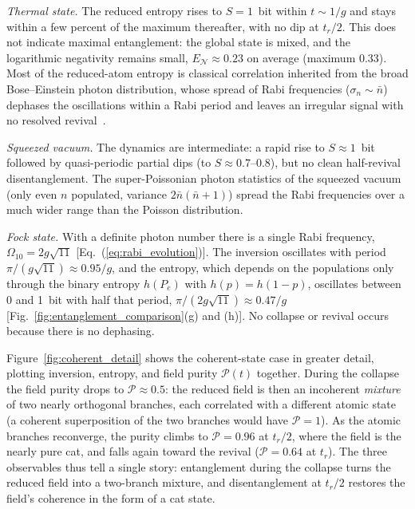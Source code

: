 \documentclass{iopjournal}
\begin{document}
\textit{Thermal state.} The reduced entropy rises to $S = 1$~bit within $t \sim 1/g$ and stays within a few percent of the maximum thereafter, with no dip at $t_r/2$. This does not indicate maximal entanglement: the global state is mixed, and the logarithmic negativity remains small, $E_{\mathcal{N}} \approx 0.23$ on average (maximum 0.33). Most of the reduced-atom entropy is classical correlation inherited from the broad Bose--Einstein photon distribution, whose spread of Rabi frequencies ($\sigma_n \sim \bar{n}$) dephases the oscillations within a Rabi period and leaves an irregular signal with no resolved revival~\cite{knight1982}.

\textit{Squeezed vacuum.} The dynamics are intermediate: a rapid rise to $S \approx 1$~bit followed by quasi-periodic partial dips (to $S \approx 0.7$--$0.8$), but no clean half-revival disentanglement. The super-Poissonian photon statistics of the squeezed vacuum (only even $n$ populated, variance $2\bar{n}(\bar{n}+1)$) spread the Rabi frequencies over a much wider range than the Poisson distribution.

\textit{Fock state.} With a definite photon number there is a single Rabi frequency, $\Omega_{10} = 2g\sqrt{11}$ [Eq.~(\ref{eq:rabi_evolution})]. The inversion oscillates with period $\pi/(g\sqrt{11}) \approx 0.95/g$, and the entropy, which depends on the populations only through the binary entropy $h(P_e)$ with $h(p) = h(1-p)$, oscillates between 0 and 1~bit with half that period, $\pi/(2g\sqrt{11}) \approx 0.47/g$ [Fig.~\ref{fig:entanglement_comparison}(g) and (h)]. No collapse or revival occurs because there is no dephasing.

Figure~\ref{fig:coherent_detail} shows the coherent-state case in greater detail, plotting inversion, entropy, and field purity $\mathcal{P}(t)$ together. During the collapse the field purity drops to $\mathcal{P} \approx 0.5$: the reduced field is then an incoherent \emph{mixture} of two nearly orthogonal branches, each correlated with a different atomic state (a coherent superposition of the two branches would have $\mathcal{P} = 1$). As the atomic branches reconverge, the purity climbs to $\mathcal{P} = 0.96$ at $t_r/2$, where the field is the nearly pure cat, and falls again toward the revival ($\mathcal{P} = 0.64$ at $t_r$). The three observables thus tell a single story: entanglement during the collapse turns the reduced field into a two-branch mixture, and disentanglement at $t_r/2$ restores the field's coherence in the form of a cat state.
\end{document}
